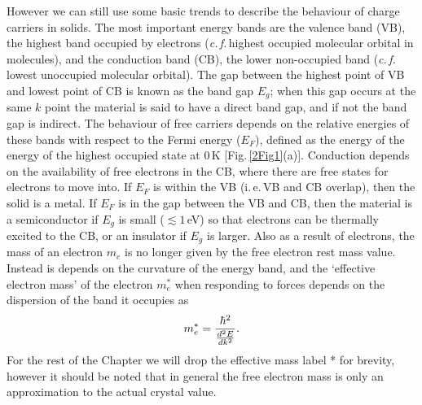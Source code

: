 However we can still use some basic trends to describe the behaviour of charge carriers in solids. The most important energy bands are the valence band (VB), the highest band occupied by electrons (\textit{c.\,f.\,}highest occupied molecular orbital in molecules), and the conduction band (CB), the lower non-occupied band (\textit{c.\,f.\,}lowest unoccupied molecular orbital). The gap between the highest point of VB and lowest point of CB is known as the band gap $E_g$; when this gap occurs at the same $k$ point the material is said to have a direct band gap, and if not the band gap is indirect. The behaviour of free carriers depends on the relative energies of these bands with respect to the Fermi energy ($E_F$), defined as the energy of the energy of the highest occupied state at 0\,K [Fig.\,\ref{2Fig1}(a)]. Conduction depends on the availability of free electrons in the CB, where there are free states for electrons to move into. If $E_F$ is within the VB (i.\,e.\,VB and CB overlap), then the solid is a metal. If $E_F$ is in the gap between the VB and CB, then the material is a semiconductor if $E_g$ is small ($\lesssim1$\,eV) so that electrons can be thermally excited to the CB, or an insulator if $E_g$ is larger. Also as a result of electrons, the mass of an electron $m_e$ is no longer given by the free electron rest mass value. Instead is depends on the curvature of the energy band, and the `effective electron mass' of the electron $m_e^{*}$ when responding to forces depends on the dispersion of the band it occupies as
\begin{equation}
\centering
m_e^{*} = \frac{\hbar^2}{\frac{d^2E}{dk^2}} .
\label{effectivemass}
\end{equation}
For the rest of the Chapter we will drop the effective mass label * for brevity, however it should be noted that in general the free electron mass is only an approximation to the actual crystal value.

